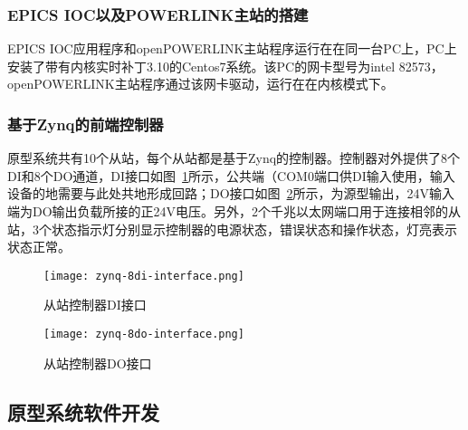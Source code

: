 \subsubsection{EPICS IOC以及POWERLINK主站的搭建}

EPICS IOC应用程序和openPOWERLINK主站程序运行在在同一台PC上，PC上安装了带有内核实时补丁3.10的Centos7系统。该PC的网卡型号为intel 82573，openPOWERLINK主站程序通过该网卡驱动，运行在在内核模式下。

\subsubsection{基于Zynq的前端控制器}

原型系统共有10个从站，每个从站都是基于Zynq的控制器。控制器对外提供了8个DI和8个DO通道，DI接口如图~\ref{fig:zynq-8di-interface}所示，公共端（COM0端口供DI输入使用，输入设备的地需要与此处共地形成回路；DO接口如图~\ref{fig:zynq-8do-interface}所示，为源型输出，24V输入端为DO输出负载所接的正24V电压。另外，2个千兆以太网端口用于连接相邻的从站，3个状态指示灯分别显示控制器的电源状态，错误状态和操作状态，灯亮表示状态正常。

\begin{figure}[!htb]
  \centering
  \texttt{[image: zynq-8di-interface.png]}
  \caption{从站控制器DI接口}
  \label{fig:zynq-8di-interface}
\end{figure}

\begin{figure}[!htb]
  \centering
  \texttt{[image: zynq-8do-interface.png]}
  \caption{从站控制器DO接口}
  \label{fig:zynq-8do-interface}
\end{figure}

\subsection{原型系统软件开发}

\label{subsection:原型系统软件开发}

